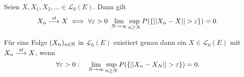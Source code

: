 \begin{theorem}
    Seien $X, X_1,X_2,... \in \mathcal{L}_0(E)$. Dann gilt
    \begin{align*}
        X_n \overset{st}{\longrightarrow} X \iff \forall \varepsilon > 0 \ \lim_{N \to \infty}\sup_{n \geq N}P(\{\lvert\lvert X_n - X \rvert\rvert > \varepsilon \}) = 0.
    \end{align*}
\end{theorem}

\begin{theorem}
    Für eine Folge $(X_n)_{n \in \mathbb{N}}$ in $\mathcal{L}_0(E)$ existiert genau dann ein $X \in \mathcal{L}_0(E)$ mit \mbox{$X_n \overset{st}{\longrightarrow} X$}, wenn
    $$
        \forall \varepsilon > 0 : \quad \lim_{N \to \infty}\sup_{n\geq N}P(\{\lvert\lvert X_n - X_N \rvert\rvert > \varepsilon \}) = 0. 
    $$
\end{theorem}


